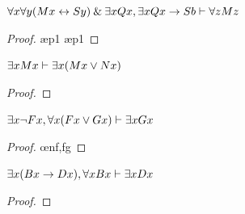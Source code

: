 \begin{earg}
\noindent\begin{minipage}{0.99\textwidth}
\item $\forall x \forall y(Mx \leftrightarrow Sy) \mathbin{\&} \exists xQx, \exists xQx \rightarrow Sb \vdash \forall zMz$

\begin{proof}
	 \pr{}
	 \pr{}
	 \ae{p1}
	 \ae{p1}
	 
	 
	 
	 
	 
\end{proof}
\end{minipage}
\bigskip



\noindent\begin{minipage}{0.99\textwidth}
\item $\exists xMx \vdash \exists x(Mx \vee Nx)$

\begin{proof}
	 \pr{}
	\open
		 \as{}
		 
		 
	\close
	 
\end{proof}
\bigskip
\end{minipage}

\noindent\begin{minipage}{0.99\textwidth}
\item $\exists x {\neg} Fx, \forall x(Fx \vee Gx) \vdash \exists xGx$

\begin{proof}
	 \pr{}
	 \pr{}
	\open
		 \as{}
		 
		 \oe{nf,fg}
		 
	\close
	 
\end{proof}
\bigskip
\end{minipage}



\noindent\begin{minipage}{0.99\textwidth}
\item $\exists x(Bx \rightarrow Dx), \forall xBx \vdash \exists xDx$

\begin{proof}
	 \pr{}
	 \pr{}
	\open
		 \as{}
		 
		 
		 
	\close
	 
\end{proof}
\end{minipage}




\end{earg}
